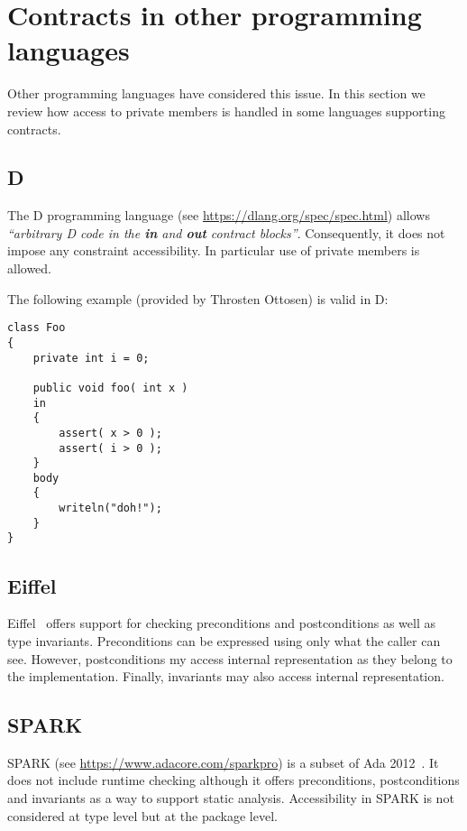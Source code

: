 \section{Contracts in other programming languages}

Other programming languages have considered this issue. 
In this section we review how access to private members is handled
in some languages supporting contracts.

\subsection{D}

The D programming language (see \url{https://dlang.org/spec/spec.html}) allows
\emph{``arbitrary D code in the \textbf{in} and \textbf{out} contract
blocks''}. Consequently, it does not impose any constraint accessibility. In
particular use of private members is allowed.

The following example (provided by Throsten Ottosen) is valid in D:

\begin{lstlisting}[morekeywords={in,body}]
class Foo
{
    private int i = 0;
    
    public void foo( int x ) 
    in
    {
        assert( x > 0 );
        assert( i > 0 );
    }
    body
    {
        writeln("doh!"); 
    }
}
\end{lstlisting}

\subsection{Eiffel}

Eiffel~\cite{iso-eiffel,ecma-eiffel} offers support for checking preconditions
and postconditions as well as type invariants. Preconditions can be expressed
using only what the caller can see. However, postconditions my access internal
representation as they belong to the implementation. Finally, invariants may
also access internal representation.

\subsection{SPARK}

SPARK (see \url{https://www.adacore.com/sparkpro}) is a subset of Ada
2012~\cite{Ada2012}. It does not include runtime checking although it offers
preconditions, postconditions and invariants as a way to support static
analysis. Accessibility in SPARK is not considered at type level but at the
package level.


